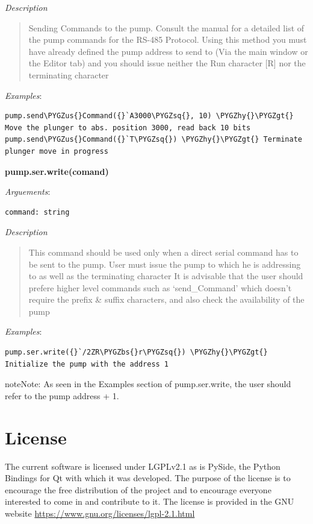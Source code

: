 \documentclass[letterpaper,10pt,english]{sphinxmanual}
\def\PYGZbs{\char`\\}
\def\PYGZus{\char`\_}
\def\PYGZgt{\char`\>}
\def\PYGZhy{\char`\-}
\def\PYGZsq{\char`\'}
\begin{document}
\emph{Description}
\begin{quote}

Sending Commands to the pump.
Consult the manual for a detailed list of the pump commands for the RS-485 Protocol.
Using this method you must have already defined the pump address to send to (Via
the main window or the Editor tab) and you should issue neither
the Run character {[}R{]} nor the terminating character
\end{quote}

\emph{Examples}:

\begin{Verbatim}[commandchars=\\\{\}]
pump.send\PYGZus{}Command({}`A3000\PYGZsq{}, 10) \PYGZhy{}\PYGZgt{} Move the plunger to abs. position 3000, read back 10 bits
pump.send\PYGZus{}Command({}`T\PYGZsq{}) \PYGZhy{}\PYGZgt{} Terminate plunger move in progress
\end{Verbatim}

\textbf{pump.ser.write(comand)}

\emph{Arguements}:

\begin{Verbatim}[commandchars=\\\{\}]
command: string
\end{Verbatim}

\emph{Description}
\begin{quote}

This command should be used only when a direct serial command has to be sent to the pump.
User must issue the pump to which he is addressing to as well as the terminating character
It is advisable that the user should prefere higher level commands such as `send\_Command'
which doesn't require the prefix \& suffix characters, and also check the availability of the pump
\end{quote}

\emph{Examples}:

\begin{Verbatim}[commandchars=\\\{\}]
pump.ser.write({}`/2ZR\PYGZbs{}r\PYGZsq{}) \PYGZhy{}\PYGZgt{} Initialize the pump with the address 1
\end{Verbatim}

\begin{notice}{note}{Note:}
As seen in the Examples section of pump.ser.write, the user should refer to the pump
address + 1.
\end{notice}


\section{License}
\label{license::doc}\label{license:license}
The current software is licensed under LGPLv2.1 as is PySide, the Python Bindings for Qt with which
it was developed. The purpose of the license is to encourage the free distribution of the
project and to encourage everyone interested to come in and contribute to it. The license
is provided in the GNU website \href{https://www.gnu.org/licenses/lgpl-2.1.html}{https://www.gnu.org/licenses/lgpl-2.1.html}
\end{document}
